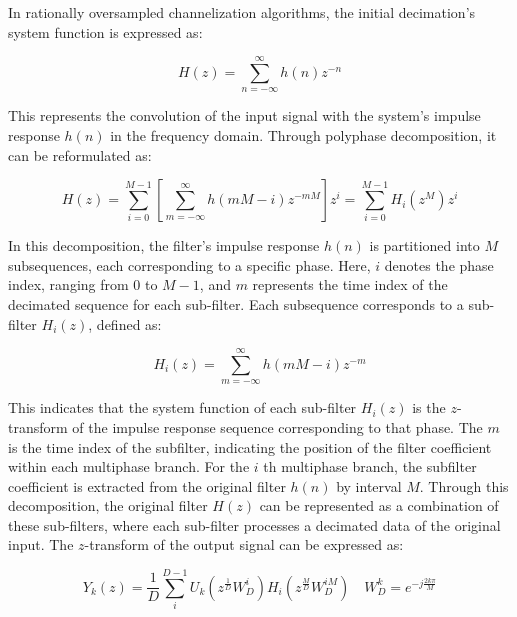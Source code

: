 \documentclass[referee]{raa}
\begin{document}
In rationally oversampled channelization algorithms, the initial decimation's system function is expressed as:

\begin{equation}
H(z) = \sum_{n=-\infty}^{\infty} h(n) z^{-n}  \label{eqa}
\end{equation}

This represents the convolution of the input signal with the system's impulse response \( h(n) \) in the frequency domain. Through polyphase decomposition, it can be reformulated as:

\begin{equation}
 H(z) = \sum_{i=0}^{M-1} \left[ \sum_{m=-\infty}^{\infty} h(mM - i) z^{-mM} \right] z^i = \sum_{i=0}^{M-1} H_i(z^M) z^i  \label{eqb}
\end{equation}

In this decomposition, the filter's impulse response \( h(n) \) is partitioned into \( M \) subsequences, each corresponding to a specific phase. Here, \( i \) denotes the phase index, ranging from \( 0 \) to \( M-1 \), and \( m \) represents the time index of the decimated sequence for each sub-filter. Each subsequence corresponds to a sub-filter \( H_i(z) \), defined as:

\begin{equation}
 H_i(z) = \sum_{m=-\infty}^{\infty} h(mM - i) z^{-m} \label{eqc}
\end{equation}

This indicates that the system function of each sub-filter \( H_i(z) \) is the \( z \)-transform of the impulse response sequence corresponding to that phase. 
The \(m \) is the time index of the subfilter, indicating the position of the filter coefficient within each multiphase branch. For the \(i \) th multiphase branch, the subfilter coefficient is extracted from the original filter \(h (n)\) by interval \(M \).
Through this decomposition, the original filter \( H(z) \) can be represented as a combination of these sub-filters, where each sub-filter processes a decimated data of the original input. The \(z\)-transform of the output signal can be expressed as: 

\begin{equation}
   Y_k(z)=\frac 1 D \sum _i ^{D-1}U_k(z^ \frac 1 D W_D^i)H_i(z^ \frac M D W_D ^{iM}) \quad W_D^k=e^{-j\frac {2k\pi} M}  \label{eq1}
\end{equation}

\end{document}
